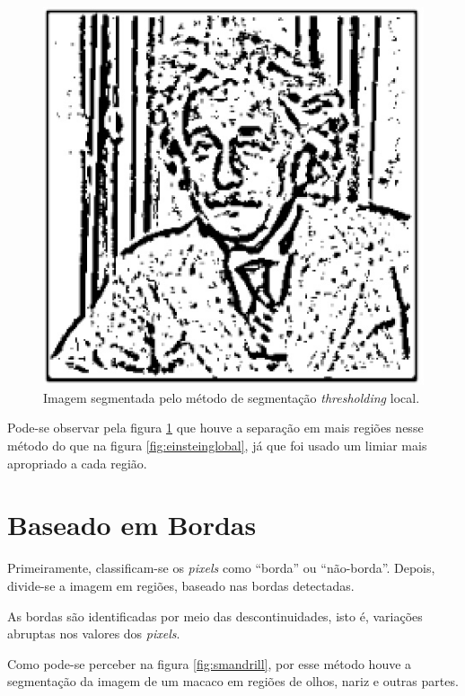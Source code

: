  \begin{figure}[!htb]
       \begin{center}  
          \includegraphics[width=0.3\columnwidth]{img/einstein-localthresholding-adaptivegausian.jpg}
           \caption{\label{fig:einsteinlocal}Imagem segmentada pelo método de segmentação \textit{thresholding} local.}
       \end{center}
   \end{figure}
   
   Pode-se observar pela figura \ref{fig:einsteinlocal} que houve a separação em mais regiões nesse método do que na figura \ref{fig:einsteinglobal}, já que foi usado um limiar mais apropriado a cada região.

\section{Baseado em Bordas}
Primeiramente, classificam-se os \textit{pixels} como “borda” ou “não-borda”.
Depois, divide-se a imagem em regiões, baseado nas bordas detectadas.

As bordas são identificadas por meio das descontinuidades, isto é, variações abruptas nos valores dos \textit{pixels}. 

Como pode-se perceber na figura \ref{fig:smandrill}, por esse método houve a segmentação da imagem de um macaco em regiões de olhos, nariz e outras partes. 

